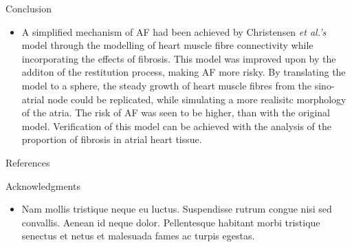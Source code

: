 \documentclass[final,hyperref={pdfpagelabels=false}]{beamer}
\begin{document}
\begin{frame}[t]
\begin{columns}[t]
\begin{column}{.465\textwidth}
\begin{block}{Conclusion}
\begin{itemize}
\item A simplified mechanism of AF had been achieved by Christensen \emph{et al.'s} model through the modelling of heart muscle fibre connectivity while incorporating the effects of fibrosis. This model was improved upon by the additon of the restitution process, making AF more risky. By translating the model to a sphere, the steady growth of heart muscle fibres from the sino-atrial node could be replicated, while simulating a more realisitc morphology of the atria. The risk of AF was seen to be higher, than with the original model. Verification of this model can be achieved with the analysis of the proportion of fibrosis in atrial heart tissue. 
\end{itemize}
\end{block}


\begin{block}{References}
        
\nocite{*} %
\small{
}

\end{block}


\begin{block}{Acknowledgments}

\begin{itemize}
\item Nam mollis tristique neque eu luctus. Suspendisse rutrum congue nisi sed convallis. Aenean id neque dolor. Pellentesque habitant morbi tristique senectus et netus et malesuada fames ac turpis egestas.
\end{itemize}

\end{block}



\end{column}
\end{columns}
\end{frame}
\end{document}
